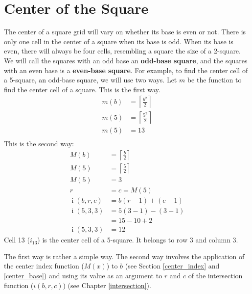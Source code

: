 \documentclass[twoside,openany,12pt]{book}
\begin{document}
    \section{Center of the Square} \label{center_square}
    \nointerlineskip
    The center of a square grid will vary on whether its base is even or not. There is only one cell in the center of a square when its base is odd. When its base is even, there will always be four cells, resembling a square the size of a 2-square. We will call the squares with an odd base an \textbf{odd-base square}, and the squares with an even base is a \textbf{even-base square}.
    For example, to find the center cell of a 5-square, an odd-base square, we will use two ways. Let $m$ be the function to find the center cell of a square. This is the first way.
    \begin{equation}
        \begin{split}
            m(b) &= \left\lceil \frac{b^2}{2} \right\rceil \\
            m(5) &= \left\lceil \frac{5^2}{2} \right\rceil \\
            m(5) &= 13 \\
        \end{split}
    \end{equation}
    This is the second way:
    \begin{equation}
        \begin{split}
            M(b) &= \left\lceil \frac{b}{2} \right\rceil \\
            M(5) &= \left\lceil \frac{5}{2} \right\rceil \\
            M(5) &= 3 \\
            r &= c = M(5) \\
            \operatorname{i}(b,r,c) &= b(r-1) + (c-1) \\
            \operatorname{i}(5,3,3) &= 5(3-1) - (3-1) \\
                &= 15 - 10 + 2 \\
            \operatorname{i}(5,3,3) &= 12
        \end{split}
    \end{equation}
    Cell 13 ($i_{13}$) is the center cell of a 5-square. It belongs to row 3 and column 3.

    The first way is rather a simple way. The second way involves the application of the center index function ($M(x)$) to $b$ (see Section \ref{center_index} and \ref{center_base}) and using its value as an argument to $r$ and $c$ of the intersection function ($i(b,r,c)$) (see Chapter \ref{intersection}).
\end{document}
